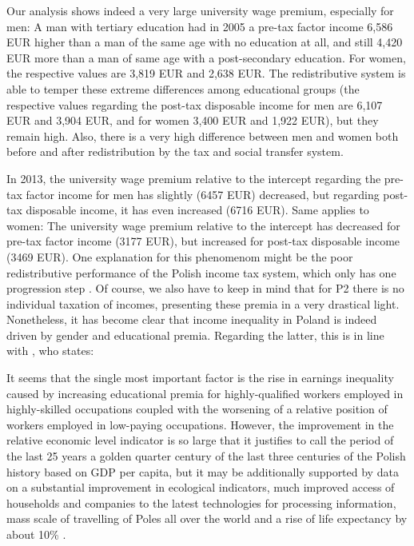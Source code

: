 \documentclass[a4paper]{article}\usepackage[]{graphicx}\usepackage[]{color}
\begin{document}
Our analysis shows indeed a very large university wage premium, especially for men: A man with tertiary education had in 2005 a pre-tax factor income 6,586 EUR higher than a man of the same age with no education at all, and still 4,420 EUR more than a man of same age with a post-secondary education. For women, the respective values are 3,819 EUR and 2,638 EUR. The redistributive system is able to temper these extreme differences among educational groups (the respective values regarding the post-tax disposable income for men are 6,107 EUR and 3,904 EUR, and for women 3,400 EUR and 1,922 EUR), but they remain high. Also, there is a very high difference between men and women both before and after redistribution by the tax and social transfer system.

In 2013, the university wage premium relative to the intercept regarding the pre-tax factor income for men has slightly (6457 EUR) decreased, but regarding post-tax disposable income, it has even increased (6716 EUR). Same applies to women: The university wage premium relative to the intercept has decreased for pre-tax factor income (3177 EUR), but increased for post-tax disposable income (3469 EUR). One explanation for this phenomenom might be the poor redistributive performance of the Polish income tax system, which only has one progression step \parencite{pwc}. Of course, we also have to keep in mind that for P2 there is no individual taxation of incomes, presenting these premia in a very drastical light. Nonetheless, it has become clear that income inequality in Poland is indeed driven by gender and educational premia. Regarding the latter, this is in line with \cite{gomulka2016poland}, who states:

 
\begin{displayquote} 
It seems that the single most important factor is the rise in earnings inequality caused by increasing educational premia for highly-qualified workers employed in highly-skilled occupations coupled with the worsening of a relative position of workers employed in low-paying occupations.
However, the improvement in the relative economic level indicator is so large that it justifies to call the period of the last 25 years a golden quarter century of the last three centuries of the Polish history based on GDP per capita, but it may be additionally supported by data on a substantial improvement in ecological indicators, much improved access of households and companies to the latest technologies for processing information, mass scale of travelling of Poles all over the world and a rise of life expectancy by about 10\% \parencite{gomulka2016poland}.
\end{displayquote}
\end{document}
